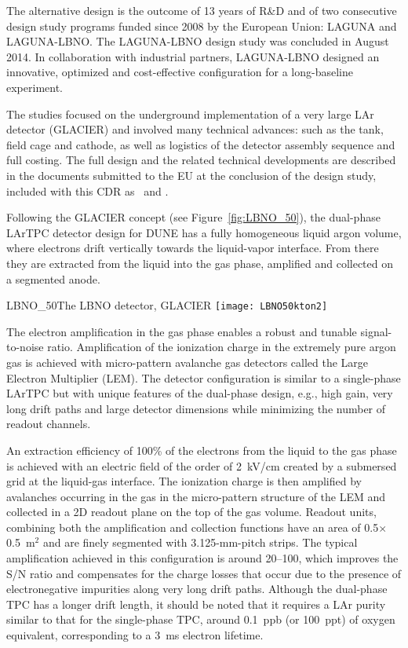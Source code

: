 The alternative design is the outcome of 13 years of R\&D and of two
consecutive design study programs funded since 2008 by the European
Union: LAGUNA and LAGUNA-LBNO. The LAGUNA-LBNO design study was
concluded in August 2014.  In collaboration with industrial partners,
LAGUNA-LBNO designed an innovative, optimized and cost-effective
configuration for a long-baseline experiment.

The studies focused on the underground implementation of a very large
LAr detector (GLACIER) and involved many technical advances: such as
the tank, field cage and cathode, as well as logistics of the detector
assembly sequence and full costing. The full design and the related
technical developments are described in the documents submitted to the
EU at the conclusion of the design study, included with this CDR as
\anxlbnoa\ and \anxlbnob.

Following the GLACIER concept\cite{LAGUNA-LBNO-deliv} (see
Figure~\ref{fig:LBNO_50}), the dual-phase LArTPC detector design for
DUNE has a fully homogeneous liquid argon volume, where electrons
drift vertically towards the liquid-vapor interface. From there they
are extracted from the liquid into the gas phase, amplified and
collected on a segmented
anode\cite{Badertscher:2013wm,Badertscher:2012dq,Badertscher:2010zg}. 
\begin{cdrfigure}{LBNO_50}{The  LBNO detector, GLACIER}
\texttt{[image: LBNO50kton2]}
\end{cdrfigure}
The electron amplification in the gas phase enables a robust and
tunable signal-to-noise ratio. Amplification of the ionization charge
in the extremely pure argon gas is achieved with micro-pattern
avalanche gas detectors called the Large Electron Multiplier
(LEM). The detector configuration is similar to a single-phase LArTPC
but with  unique features of the dual-phase design, e.g., high gain,
very long drift paths and large detector dimensions while minimizing
the number of readout channels.


An extraction efficiency of 100\% of the electrons from the liquid to
the gas phase is achieved with an electric field of the order of
2~kV/cm created by a submersed grid at the liquid-gas interface. The
ionization charge is then amplified by avalanches occurring in the gas
in the micro-pattern structure of the LEM and collected in a 2D
readout plane on the top of the gas volume. Readout units, combining
both the amplification and collection functions have an area of
0.5$\times$0.5~m$^2$ and are finely segmented with 3.125-mm-pitch
strips. The typical amplification achieved in this configuration is
around 20--100, which improves the S/N ratio and compensates for the
charge losses that occur due to the presence of electronegative
impurities along very long drift paths. Although the dual-phase TPC
has a longer drift length, it should be noted that it requires a LAr
purity similar to that for the single-phase TPC, around 0.1~ppb (or
100~ppt) of oxygen equivalent, corresponding to a 3~ms electron
lifetime.

